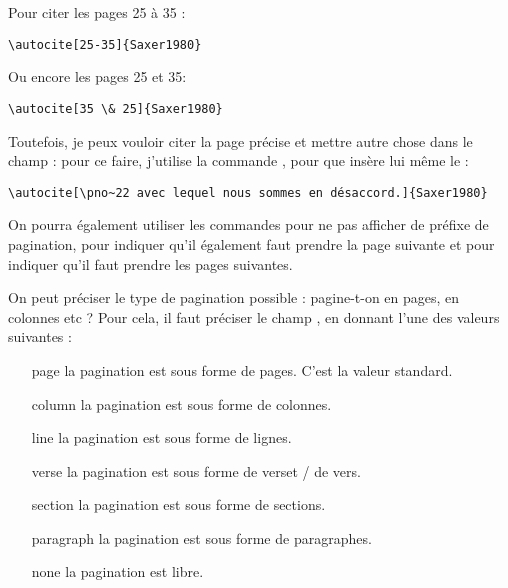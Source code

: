  Pour citer les pages 25 à 35 :

\begin{verbatim}
\autocite[25-35]{Saxer1980}
\end{verbatim}

Ou encore les pages 25 et 35:

\begin{verbatim}
\autocite[35 \& 25]{Saxer1980}
\end{verbatim}

Toutefois, je peux vouloir citer la page précise et mettre autre chose dans le champ  : pour ce faire, j'utilise la commande , pour que  insère lui même le  :

\begin{verbatim}
\autocite[\pno~22 avec lequel nous sommes en désaccord.]{Saxer1980}
\end{verbatim}

\begin{quotation}
	\parencite[\pno~22 avec lequel nous sommes en désaccord.]{Saxer1980}
\end{quotation}

On pourra également utiliser les commandes  pour ne pas afficher de préfixe de pagination,   pour indiquer qu'il également faut prendre la page suivante et  pour indiquer qu'il faut prendre les pages suivantes.

On peut préciser le type de pagination possible : pagine-t-on en pages, en colonnes etc ? Pour cela, il faut préciser le champ , en donnant l'une des valeurs suivantes : 

\begin{enumerate}
\item[page]la pagination est sous forme de pages. C'est la valeur standard.
\item[column]la pagination est sous forme de colonnes.
\item[line]la pagination est sous forme de lignes.
\item[verse]la pagination est sous forme de verset / de vers. 
\item[section]la pagination est sous forme de sections.
\item[paragraph]la pagination est sous forme de paragraphes.
\item[none]la pagination est libre.
\end{enumerate}



